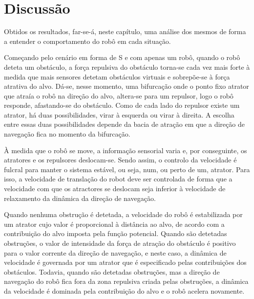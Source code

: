 \section{Discussão}
\label{sec:disc}

Obtidos os resultados, far-se-á, neste capítulo, uma análise dos mesmos de forma a entender o comportamento do robô em cada situação.

Começando pelo cenário em forma de S e com apenas um robô, quando o robô deteta um obstáculo, a força repulsiva do obstáculo torna-se cada vez mais forte à medida que mais sensores detetam obstáculos virtuais e sobrepõe-se à força atrativa do alvo. Dá-se, nesse momento, uma bifurcação onde o ponto fixo atrator que atraía o robô na direção do alvo, altera-se para um repulsor, logo o robô responde, afastando-se do obstáculo. Como de cada lado do repulsor existe um atrator, há duas possibilidades, virar à esquerda ou virar à direita. A escolha entre essas duas possibilidades depende da bacia de atração em que a direção de navegação fica no momento da bifurcação.

À medida que o robô se move, a informação sensorial varia e, por conseguinte, os atratores e os repulsores deslocam-se. Sendo assim, o controlo da velocidade é fulcral para manter o sistema estável, ou seja, num, ou perto de um, atrator. Para isso, a velocidade de translação do robot deve ser controlada de forma que a velocidade com que os atractores se deslocam seja inferior à velocidade de relaxamento da dinâmica da direção de navegação. 

Quando nenhuma obstrução é detetada, a velocidade do robô é estabilizada por um atrator cujo valor é proporcional à distância ao alvo, de acordo com a contribuição do alvo imposta pela função potencial. Quando são detetadas obstruções, o valor de intensidade da força de atração do obstáculo é positivo para o valor corrente da direção de navegação, e neste caso, a dinâmica de velocidade é governada por um atrator que é especificado pelas contribuições dos obstáculos. Todavia, quando são detetadas obstruções, mas a direção de navegação do robô fica fora da zona repulsiva criada pelas obstruções, a dinâmica da velocidade é dominada pela contribuição do alvo e o robô acelera novamente.

